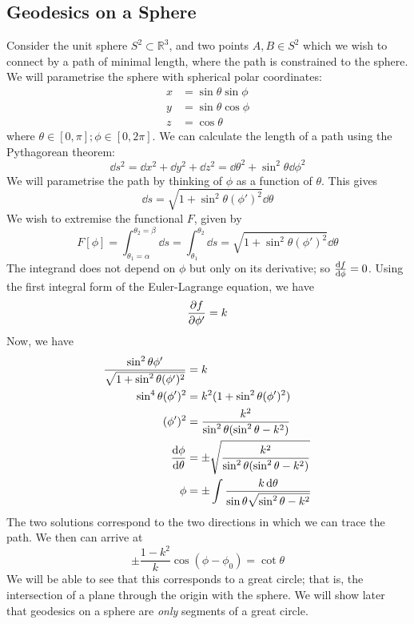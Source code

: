 \subsection{Geodesics on a Sphere}
Consider the unit sphere \( S^2 \subset \mathbb R^3 \), and two points \( A, B \in S^2 \) which we wish to connect by a path of minimal length, where the path is constrained to the sphere.
We will parametrise the sphere with spherical polar coordinates:
\begin{align*}
	x & = \sin\theta \sin\phi \\
	y & = \sin\theta\cos\phi  \\
	z & = \cos\theta
\end{align*}
where \( \theta \in [0, \pi]; \phi \in [0, 2\pi] \).
We can calculate the length of a path using the Pythagorean theorem:
\[
	\dd{s}^2 = \dd{x}^2 + \dd{y}^2 + \dd{z}^2 = \dd{\theta}^2 + \sin^2 \theta \dd{\phi}^2
\]
We will parametrise the path by thinking of \( \phi \) as a function of \( \theta \).
This gives
\[
	\dd{s} = \sqrt{1 + \sin^2 \theta (\phi')^2} \dd{\theta}
\]
We wish to extremise the functional \( F \), given by
\[
	F[\phi] = \int_{\theta_1 = \alpha}^{\theta_2 = \beta} \dd{s} = \int_{\theta_1}^{\theta_2} \dd{s} = \sqrt{1 + \sin^2 \theta (\phi')^2} \dd{\theta}
\]
The integrand does not depend on \( \phi \) but only on its derivative; so \( \dv{f}{\phi} = 0 \).
Using the first integral form of the Euler-Lagrange equation, we have
\[
	\pdv{f}{\phi'} = k
\]
Now, we have
\begin{align*}
	\frac{\sin^2 \theta \phi'}{\sqrt{1 + \sin^2 \theta (\phi')^2}} & = k                                                                    \\
	\sin^4 \theta (\phi')^2                                        & = k^2 (1 + \sin^2 \theta (\phi')^2)                                    \\
	(\phi')^2                                                      & = \frac{k^2}{\sin^2 \theta (\sin^2 \theta - k^2)}                      \\
	\dv{\phi}{\theta}                                              & = \pm\sqrt{\frac{k^2}{\sin^2 \theta (\sin^2 \theta - k^2)}}            \\
	\phi                                                           & = \pm\int \frac{k \dd{\theta}}{\sin \theta \sqrt{\sin^2 \theta - k^2}} \\
\end{align*}
The two solutions correspond to the two directions in which we can trace the path.
We then can arrive at
\[
	\pm \frac{1 - k^2}{k} \cos(\phi - \phi_0) = \cot \theta
\]
We will be able to see that this corresponds to a great circle; that is, the intersection of a plane through the origin with the sphere.
We will show later that geodesics on a sphere are \textit{only} segments of a great circle.

